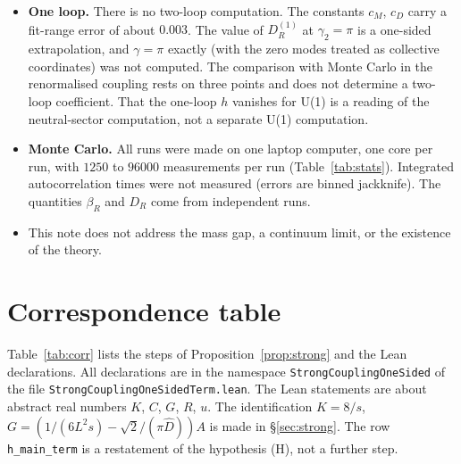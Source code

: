\documentclass[11pt,a4paper]{article}
\theoremstyle{definition}
\theoremstyle{remark}
\newcommand{\bR}{\beta_R}
\newcommand{\DR}{D_R}
\begin{document}
\begin{itemize}[leftmargin=2em]
\item \textbf{One loop.} There is no two-loop computation. The constants $c_M$, $c_D$ carry a fit-range error of about $0.003$. The value of $\DR^{(1)}$ at $\gamma_2=\pi$ is a one-sided extrapolation, and $\gamma=\pi$ exactly (with the zero modes treated as collective coordinates) was not computed. The comparison with Monte Carlo in the renormalised coupling rests on three points and does not determine a two-loop coefficient. That the one-loop $h$ vanishes for U(1) is a reading of the neutral-sector computation, not a separate U(1) computation.
\item \textbf{Monte Carlo.} All runs were made on one laptop computer, one core per run, with $1250$ to $96000$ measurements per run (Table~\ref{tab:stats}). Integrated autocorrelation times were not measured (errors are binned jackknife). The quantities $\bR$ and $\DR$ come from independent runs.
\item This note does not address the mass gap, a continuum limit, or the existence of the theory.
\end{itemize}

\section{Correspondence table}\label{sec:corr}

Table~\ref{tab:corr} lists the steps of Proposition~\ref{prop:strong} and the Lean declarations. All declarations are in the namespace \texttt{StrongCouplingOneSided} of the file \texttt{StrongCouplingOneSidedTerm.lean}. The Lean statements are about abstract real numbers $K$, $C$, $G$, $R$, $u$. The identification $K=8/s$, $G=(1/(6L^2s)-\sqrt2/(\pi\hat D))A$ is made in \S\ref{sec:strong}. The row \texttt{h\_main\_term} is a restatement of the hypothesis (H), not a further step.
\end{document}
